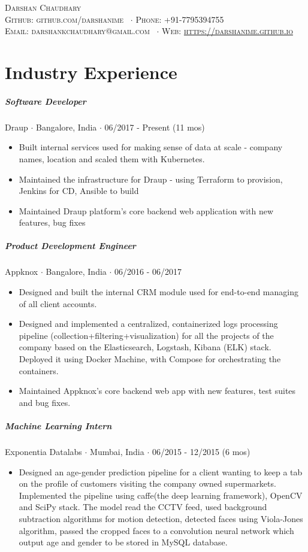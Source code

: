 \documentclass[10pt,letterpaper]{article}
\newcommand{\namestyle}{\Huge \scshape}
\newcommand{\addressstyle}{\color{addresscolor} \footnotesize \rmfamily \upshape}
\begin{document}
\begin{center}
    \namestyle Darshan Chaudhary \\[0.3em]
    \addressstyle Github: github.com/darshanime \ $\cdot$ Phone: +91-7795394755\\
    Email: darshankchaudhary@gmail.com \ $\cdot$ Web: \url{https://darshanime.github.io}
\end{center}

\small


\section*{Industry Experience}

\subparagraph{Software Developer}
Draup $\cdot$ Bangalore, India $\cdot$ 06/2017 - Present (11 mos)
\begin{itemize}
    \item Built internal services used for making sense of data at scale - company names, location and scaled them with Kubernetes.
    \item Maintained the infrastructure for Draup - using Terraform to provision, Jenkins for CD, Ansible to build
    \item Maintained Draup platform's core backend web application with new features, bug fixes
\end{itemize}

\subparagraph{Product Development Engineer}
Appknox $\cdot$ Bangalore, India $\cdot$ 06/2016 - 06/2017
\begin{itemize}
    \item Designed and built the internal CRM module used for end-to-end managing of all client accounts.
    \item Designed and implemented a centralized, containerized logs processing pipeline (collection+filtering+visualization) for all the projects of the company based on the Elasticsearch, Logstash, Kibana (ELK) stack. Deployed it using Docker Machine, with Compose for orchestrating the containers.
    \item Maintained Appknox's core backend web app with new features, test suites and bug fixes.
\end{itemize}

\subparagraph{Machine Learning Intern}
Exponentia Datalabs $\cdot$ Mumbai, India $\cdot$ 06/2015 - 12/2015 (6 mos)
\begin{itemize}
    \item Designed an age-gender prediction pipeline for a client wanting to keep a tab on the profile of customers visiting the company owned supermarkets. Implemented the pipeline using caffe(the deep learning framework), OpenCV and SciPy stack. The model read the CCTV feed, used background subtraction algorithms for motion detection, detected faces using Viola-Jones algorithm, passed the cropped faces to a convolution neural network which output age and gender to be stored in MySQL database.
\end{itemize}
\end{document}
